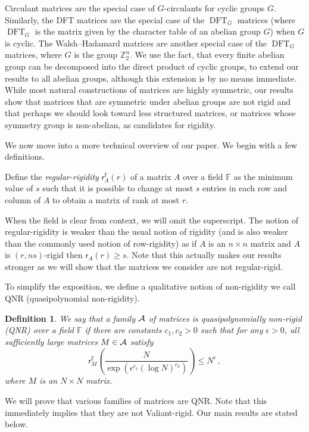 \documentclass{toc}
\newtheorem{define}[theorem]{Definition}
\newcommand\F{{\mathbb{F}}}
\renewcommand\Z{{\mathbb{Z}}}
\newcommand{\eps}{\epsilon}
\DeclareMathOperator{\DFT}{DFT}
\begin{document}
%
%

%
%
%
%
%
%
%
Circulant matrices are the special case of
$G$-circulants
%
%
%
for cyclic groups $G$.  Similarly, the DFT matrices 
are the special case of the $\DFT_G$ matrices %
(where $\DFT_G$ is the matrix given by the character table 
of an abelian group $G$) when
%
$G$ is cyclic.
The Walsh--Hadamard matrices are another special case of
the $\DFT_G$ matrices, where $G$ is the group $\Z_2^n$.  %
%
%
%
We use the fact, that 
every finite abelian group can be decomposed into 
the direct product of cyclic groups, 
to extend our results to all abelian groups, although this
extension is by no means immediate.  
While most natural constructions of matrices are highly symmetric,
our results %
%
show  %
that matrices that are  symmetric under abelian groups are not rigid and that perhaps we should look toward less structured matrices, or matrices whose symmetry group is non-abelian, as candidates for rigidity.   

We now move into a more technical overview of our paper. %
We begin with a few definitions. 
\begin{definition}
Define the \emph{regular-rigidity} 
%
%
$\textsf{r}^{\F}_A(r)$  
of a matrix $A$ over a field $\F$  %
as the minimum value of $s$ such that it is possible to change at most $s$ 
entries in each row and column of $A$ to obtain a matrix of rank at most $r$.
\end{definition}
%
%
When the field is clear from context, we will omit the superscript.%
The notion of regular-rigidity is weaker than the usual notion of rigidity (and is also weaker than the commonly used notion of row-rigidity) as if $A$ is an $n \times n$ matrix and $A$ is $(r,ns)$-rigid then $\textsf{r}_A(r) \geq s$.  Note that this actually makes our results stronger as we will show that the matrices we consider are not regular-rigid.


%
To simplify the exposition, we define a
%
%
%
%
qualitative notion  %
of non-rigidity we call QNR (quasipolynomial non-rigidity).
\begin{define}
We say that
a family $\cal A$ of matrices %
is \emph{quasipolynomially non-rigid} (QNR)  %
over a field $\F$ if there are constants $c_1,c_2 > 0$ such that for
any $\eps > 0$, all sufficiently large matrices $M \in \cal A$ satisfy
%
%
%
%
\[
\textsf{r}^{\F}_M\left( \frac{N}{\exp\left(\eps^{c_1}(\log N)^{c_2}\right)}
 \right) \leq N^{\eps} \,,
\]
where $M$ is an $N \times N$ matrix.
\end{define}  
We will prove that various families of matrices are QNR.
Note that this immediately implies that they are not Valiant-rigid.  Our main results are stated below.
%
%
\end{document}
